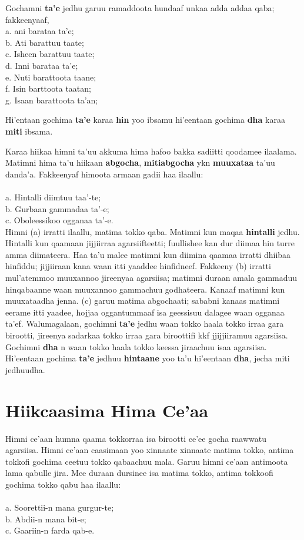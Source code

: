 \documentclass[11pt,b5paper]{book}
\begin{document}
Gochamni \textbf{ta’e} jedhu garuu ramaddoota hundaaf unkaa adda
addaa qaba; fakkeenyaaf,\\
a. ani barataa ta'e;\\
b. Ati barattuu taate;\\
c. Isheen barattuu taate;\\
d. Inni barataa ta'e;\\
e. Nuti barattoota taane;\\
f. Isin barttoota taatan;\\
g. Isaan barattoota ta'an;

 
Hi'entaan gochima \textbf{ta’e} karaa \textbf{hin} yoo ibsamu hi'eentaan gochima \textbf{dha} karaa \textbf{miti} ibsama. 

Karaa hiikaa himni ta’uu akkuma hima hafoo bakka sadiitti qoodamee ilaalama. Matimni hima ta’u hiikaan \textbf{abgocha}, \textbf{mitiabgocha} ykn \textbf{muuxataa} ta’uu danda’a. Fakkeenyaf himoota
armaan gadii haa ilaallu:  \\
\\
a. Hintalli diimtuu taa’-te;\\
b. Gurbaan gammadaa ta’-e;\\
c. Oboleessikoo ogganaa ta’-e.\\

Himni (a) irratti ilaallu, matima tokko qaba. Matimni kun maqaa \textbf{hintalli} jedhu. Hintalli kun qaamaan jijjiirraa agarsiifteetti; fuullishee kan dur diimaa hin turre amma diimateera. Haa ta’u malee matimni kun diimina qaamaa irratti dhiibaa hinfiddu; jijjiiraan kana waan itti yaaddee hinfidneef. Fakkeeny (b) irratti mul’atemmoo muuxannoo jireenyaa agarsiisa; matimni duraan amala gammaduu hinqabaanne waan muuxannoo gammachuu godhateera. Kanaaf matimni kun muuxataadha jenna. (c) garuu matima abgochaati; sababni kanaas matimni eerame itti yaadee, hojjaa oggantummaaf isa geessisuu dalagee waan ogganaa ta’ef. Walumagalaan, gochimni \textbf{ta’e} jedhu waan tokko haala tokko irraa gara birootti, jireenya sadarkaa tokko irraa gara biroottifi kkf jjijjiiramuu agarsiisa. Gochimni \textbf{dha} n waan
tokko haala tokko keessa jiraachuu isaa agarsiisa. Hi'eentaan gochima \textbf{ta’e} jedhuu \textbf{hintaane} yoo ta’u hi'eentaan \textbf{dha}, jecha miti jedhuudha.

\section{Hiikcaasima Hima Ce'aa}

Himni ce’aan  humna qaama tokkorraa isa birootti ce’ee gocha raawwatu agarsiisa. Himni ce’aan caasimaan yoo xinnaate xinnaate matima tokko, antima tokkofi gochima ceetuu tokko qabaachuu mala. Garuu himni ce’aan antimoota lama qabulle jira. Mee duraan dursinee isa matima tokko, antima tokkoofi
gochima tokko qabu haa ilaallu: \\
\\
a. Soorettii-n mana gurgur-te;\\
b. Abdii-n mana bit-e;\\
c. Gaariin-n farda qab-e.\\
\end{document}
